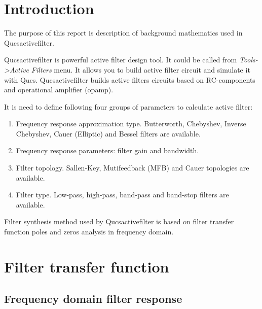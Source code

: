 %
%
%
%


\usetikzlibrary{patterns}
\usetikzlibrary{circuits}
\usetikzlibrary{circuits.ee}
\usetikzlibrary{circuits.ee.IEC}
\usetikzlibrary{circuits.logic.IEC}
\usetikzlibrary{intersections}

\tableofcontents

\chapter{Introduction}

The purpose of this report is description of background mathematics used in
Qucsactivefilter.

Qucsactivefilter is powerful active filter design tool. It could be called from
\emph{Tools->Active Filters} menu. It allows you to build active filter circuit
and simulate it with Qucs. Qucsactivefilter builds active filters circuits based
on RC-components and operational amplifier (opamp). 


It is need to define following four groups of parameters to calculate active
filter:

\begin{enumerate}
 \item Frequency response approximation type. Butterworth, Chebyshev,
Inverse Chebyshev,  Cauer (Elliptic) and Bessel filters are available.
 \item Frequency response parameters: filter gain and bandwidth.
 \item Filter topology. Sallen-Key, Mutifeedback (MFB) and Cauer topologies are
available.
 \item Filter type. Low-pass, high-pass, band-pass and band-stop filters are
available.
\end{enumerate}

Filter synthesis method used by Qucsactivefilter is based on filter transfer
function poles and zeros analysis in frequency domain.

\chapter{Filter transfer function}

\section{Frequency domain filter response}

